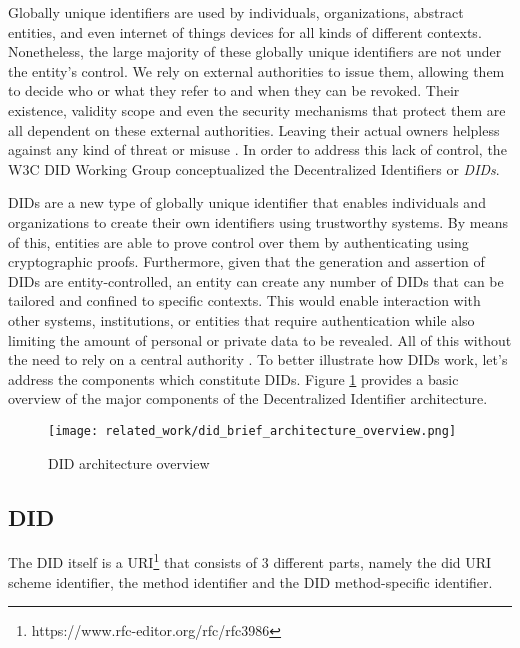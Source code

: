 Globally unique identifiers are used by individuals, organizations, abstract entities, and even internet of things devices for all kinds of different contexts. Nonetheless, the large majority of these globally unique identifiers are not under the entity's control. We rely on external authorities to issue them, allowing them to decide who or what they refer to and when they can be revoked. Their existence, validity scope and even the security mechanisms that protect them are all dependent on these external authorities. Leaving their actual owners helpless against any kind of threat or misuse \cite{sporny_longley_sabadello_reed_steele_2021}. In order to address this lack of control, the W3C DID Working Group conceptualized the Decentralized Identifiers or \emph{DIDs}.

DIDs are a new type of globally unique identifier that enables individuals and organizations to create their own identifiers using trustworthy systems. By means of this, entities are able to prove control over them by authenticating using cryptographic proofs. Furthermore, given that the generation and assertion of DIDs are entity-controlled, an entity can create any number of DIDs that can be tailored and confined to specific contexts. This would enable interaction with other systems, institutions, or entities that require authentication while also limiting the amount of personal or private data to be revealed. All of this without the need to rely on a central authority \cite{sporny_longley_sabadello_reed_steele_2021}. To better illustrate how DIDs work, let's address the components which constitute DIDs. Figure \ref{fig:did_architecture} provides a basic overview of the major components of the Decentralized Identifier architecture.

\begin{figure}[H]
  \centering
  \texttt{[image: related\_work/did\_brief\_architecture\_overview.png]}
  \caption{DID architecture overview \cite{sporny_longley_sabadello_reed_steele_2021}}
  \label{fig:did_architecture}
\end{figure}

\subsection{DID}  
The DID itself is a URI\footnote{https://www.rfc-editor.org/rfc/rfc3986} that consists of 3 different parts, namely the did URI scheme identifier, the method identifier and the DID method-specific identifier.


